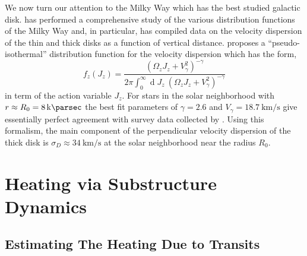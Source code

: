 \documentclass[usenatbib]{mnras}
\renewcommand{\d}[1]{\! \mathrm{d}#1 \:}
\renewcommand{\d}[1]{\ensuremath{\operatorname{d}\!{#1}}}
\begin{document}
\par
We now turn our attention to the Milky Way which has the best studied galactic disk. \cite{milky_way} has performed a comprehensive study of the various distribution functions of the Milky Way and, in particular, has compiled data on the velocity dispersion of the thin and thick disks as a function of vertical distance. \cite{milky_way} proposes a ``pseudo-isothermal'' distribution function for the velocity dispersion which has the form,
\begin{equation}
f_z(J_z) = \frac{\left( \Omega_z J_z + V_\gamma^2 \right)^{-\gamma}}{2 \pi \int_{0}^{\infty} \d{J_z} \: \left( \Omega_z J_z + V_\gamma^2 \right)^{-\gamma} }
\end{equation}  
in term of the action variable $J_z$. For stars in the solar neighborhood with $r \approx R_0 =  \SI{8}{\kilo \parsec}$ the best fit parameters of $\gamma = 2.6$ and $V_\gamma = \SI{18.7}{\kilo \meter \per \second}$ give essentially perfect agreement with survey data collected by \cite{milkyway-thickdisk}. Using this formalism, the main component of the perpendicular velocity dispersion of the thick disk is $\sigma_D \approx \SI{34}{\kilo \meter \per \second}$ at the solar neighborhood near the radius $R_0$.   



\section{Heating via Substructure Dynamics}

\subsection{Estimating The Heating Due to Transits}
\end{document}
